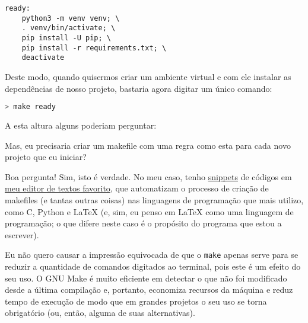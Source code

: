 \begin{lstlisting}[caption={Exemplo de makefile}]
  ready:
    python3 -m venv venv; \
    . venv/bin/activate; \
    pip install -U pip; \
    pip install -r requirements.txt; \
    deactivate
\end{lstlisting}

Deste modo, quando quisermos criar um ambiente virtual e com ele instalar as
dependências de nosso projeto, bastaria agora digitar um único comando:

\begin{lstlisting}[language=bash,caption={Reduzindo-se a quantidade de comandos digitados}]
  > make ready
\end{lstlisting}

A esta altura alguns poderiam perguntar:

Mas, eu precisaria criar um makefile com uma regra como esta para cada novo
projeto que eu iniciar?

Boa pergunta! Sim, isto é verdade. No meu caso, tenho
\href{https://github.com/SirVer/ultisnips}{snippets} de códigos em
\href{https://www.vim.org/}{meu editor de textos favorito}, que automatizam o
processo de criação de makefiles (e tantas outras coisas) nas linguagens de
programação que mais utilizo, como C, Python e \LaTeX{} (e, sim, eu penso em
\LaTeX{} como uma linguagem de programação; o que difere neste caso é o
propósito do programa que estou a escrever).

Eu não quero causar a impressão equivocada de que o \texttt{make} apenas serve
para se reduzir a quantidade de comandos digitados ao terminal, pois este é um
efeito do seu uso. O GNU Make é muito eficiente em detectar o que não foi
modificado desde a última compilação e, portanto, economiza recursos da máquina
e reduz tempo de execução de modo que em grandes projetos o seu uso se torna
obrigatório (ou, então, alguma de suas alternativas).
